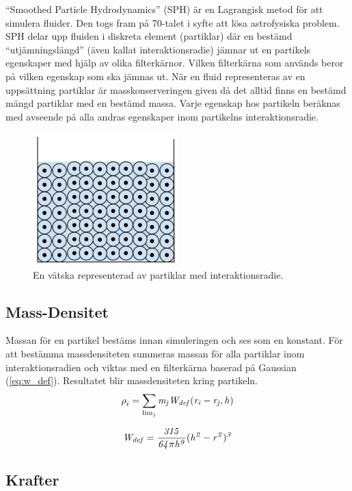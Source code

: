 \documentclass[a4paper,12pt,oneside,final]{extarticle}
\begin{document}
“Smoothed Particle Hydrodynamics” (SPH)\cite{sph} är en Lagrangisk metod för att simulera fluider.
Den togs fram på 70-talet i syfte att lösa astrofysiska problem.
SPH delar upp fluiden i diskreta element (partiklar) där en bestämd “utjämningslängd” (även kallat interaktionsradie) jämnar ut en partikels egenskaper med hjälp av olika filterkärnor.
Vilken filterkärna som används beror på vilken egenskap som ska jämnas ut.
När en fluid representeras av en uppsättning partiklar är masskonserveringen given då det alltid finns en bestämd mängd partiklar med en bestämd massa.
Varje egenskap hos partikeln beräknas med avseende på alla andras egenskaper inom partikelns interaktionsradie.
\begin{figure}[H]
  \centering
    \includegraphics[width=0.5\textwidth]{bilder/partiklar_vila}
  \caption{En vätska representerad av partiklar med interaktionsradie.}
\end{figure}

\subsection{Mass-Densitet}
Massan för en partikel bestäms innan simuleringen och ses som en konstant.
För att bestämma massdensiteten summeras massan för alla partiklar inom interaktionsradien och viktas med en filterkärna baserad på Gaussian (\ref{eq:w_def}).
Resultatet blir massdensiteten kring partikeln.
\begin{equation}
\rho^{}_{i} = \sum_{\lim_{j}} {\it m_j W_{def} (r_i-r_j,h)}
\end{equation}

\begin{equation} \label{eq:w_def}
{\it W_{def} = \frac{315}{64 \pi h^9}(h^2-r^2)^3}
\end{equation}

\subsection{Krafter}
\end{document}
